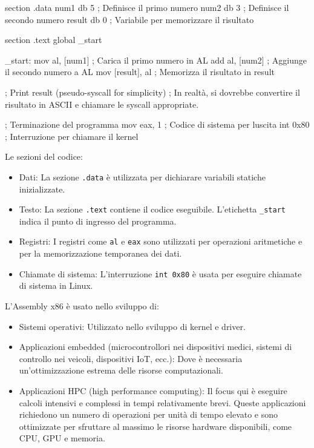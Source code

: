 \documentclass[
  letterpaper,
]{scrbook}
\newenvironment{Shaded}{\begin{snugshade}}{\end{snugshade}}
\newcommand{\NormalTok}[1]{\textcolor[rgb]{0.00,0.23,0.31}{#1}}
\providecommand{\tightlist}{%
  \setlength{\itemsep}{0pt}\setlength{\parskip}{0pt}}\usepackage{longtable,booktabs,array}
\begin{document}
\begin{Shaded}
\begin{Highlighting}[]
\NormalTok{section .data}
\NormalTok{    num1 db 5           ; Definisce il primo numero}
\NormalTok{    num2 db 3           ; Definisce il secondo numero}
\NormalTok{    result db 0         ; Variabile per memorizzare il risultato}

\NormalTok{section .text}
\NormalTok{    global \_start}

\NormalTok{\_start:}
\NormalTok{    mov al, [num1]      ; Carica il primo numero in AL}
\NormalTok{    add al, [num2]      ; Aggiunge il secondo numero a AL}
\NormalTok{    mov [result], al    ; Memorizza il risultato in result}

\NormalTok{    ; Print result (pseudo{-}syscall for simplicity)}
\NormalTok{    ; In realtà, si dovrebbe convertire il risultato in ASCII e chiamare le syscall appropriate.}
    
\NormalTok{    ; Terminazione del programma}
\NormalTok{    mov eax, 1          ; Codice di sistema per l\textquotesingle{}uscita}
\NormalTok{    int 0x80            ; Interruzione per chiamare il kernel}
\end{Highlighting}
\end{Shaded}

Le sezioni del codice:

\begin{itemize}
\tightlist
\item
  Dati: La sezione \texttt{.data} è utilizzata per dichiarare variabili
  statiche inizializzate.
\item
  Testo: La sezione \texttt{.text} contiene il codice eseguibile.
  L'etichetta \texttt{\_start} indica il punto di ingresso del
  programma.
\item
  Registri: I registri come \texttt{al} e \texttt{eax} sono utilizzati
  per operazioni aritmetiche e per la memorizzazione temporanea dei
  dati.
\item
  Chiamate di sistema: L'interruzione \texttt{int\ 0x80} è usata per
  eseguire chiamate di sistema in Linux.
\end{itemize}

L'Assembly x86 è usato nello sviluppo di:

\begin{itemize}
\tightlist
\item
  Sistemi operativi: Utilizzato nello sviluppo di kernel e driver.
\item
  Applicazioni embedded (microcontrollori nei dispositivi medici,
  sistemi di controllo nei veicoli, dispositivi IoT, ecc.): Dove è
  necessaria un'ottimizzazione estrema delle risorse computazionali.
\item
  Applicazioni HPC (high performance computing): Il focus qui è eseguire
  calcoli intensivi e complessi in tempi relativamente brevi. Queste
  applicazioni richiedono un numero di operazioni per unità di tempo
  elevato e sono ottimizzate per sfruttare al massimo le risorse
  hardware disponibili, come CPU, GPU e memoria.
\end{itemize}
\end{document}
